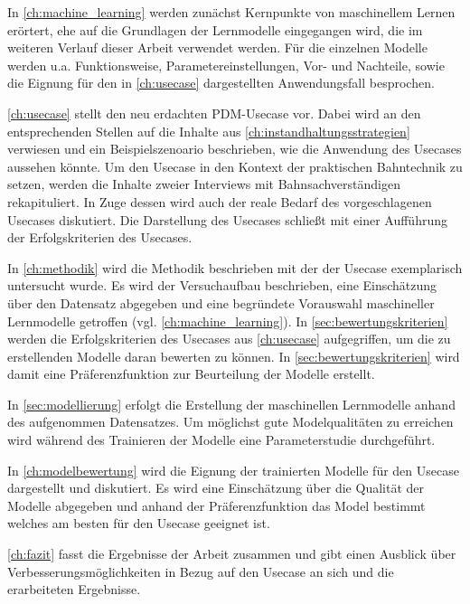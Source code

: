 In \cref{ch:machine_learning} werden zunächst Kernpunkte von maschinellem Lernen erörtert, ehe auf die Grundlagen der Lernmodelle eingegangen wird, die im weiteren Verlauf dieser Arbeit verwendet werden. Für die einzelnen Modelle werden u.a. Funktionsweise, Parametereinstellungen, Vor- und Nachteile, sowie die Eignung für den in \cref{ch:usecase} dargestellten Anwendungsfall besprochen. 

\cref{ch:usecase} stellt den neu erdachten PDM-Usecase vor. Dabei wird an den entsprechenden Stellen auf die Inhalte aus \cref{ch:instandhaltungsstrategien} verwiesen und ein Beispielszenoario beschrieben, wie die Anwendung des Usecases aussehen könnte. Um den Usecase in den Kontext der praktischen Bahntechnik zu setzen, werden die Inhalte zweier Interviews mit Bahnsachverständigen rekapituliert. In Zuge dessen wird auch der reale Bedarf des vorgeschlagenen Usecases diskutiert. Die Darstellung des Usecases schließt mit einer Aufführung der Erfolgskriterien des Usecases.

In \cref{ch:methodik} wird die Methodik beschrieben mit der der Usecase exemplarisch untersucht wurde. Es wird der Versuchaufbau beschrieben, eine Einschätzung über den Datensatz abgegeben und eine begründete Vorauswahl maschineller Lernmodelle getroffen (vgl. \cref{ch:machine_learning}). In \cref{sec:bewertungskriterien} werden die Erfolgskriterien des Usecases aus \cref{ch:usecase} aufgegriffen, um die zu erstellenden Modelle daran bewerten zu können. In \cref{sec:bewertungskriterien} wird damit eine Präferenzfunktion zur Beurteilung der Modelle erstellt.

In \cref{sec:modellierung} erfolgt die Erstellung der maschinellen Lernmodelle anhand des aufgenommen Datensatzes. Um möglichst gute Modelqualitäten zu erreichen wird während des Trainieren der Modelle eine Parameterstudie durchgeführt.

In \cref{ch:modelbewertung} wird die Eignung der trainierten Modelle für den Usecase dargestellt und diskutiert. Es wird eine Einschätzung über die Qualität der Modelle abgegeben und anhand der Präferenzfunktion das Model bestimmt welches am besten für den Usecase geeignet ist.

\cref{ch:fazit} fasst die Ergebnisse der Arbeit zusammen und gibt einen Ausblick über Verbesserungsmöglichkeiten in Bezug auf den Usecase an sich und die erarbeiteten Ergebnisse.